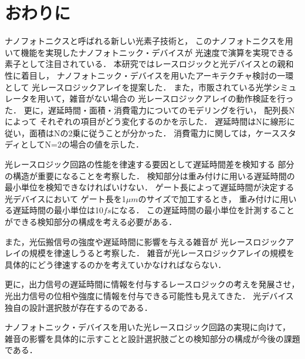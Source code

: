 \chapter{おわりに}

ナノフォトニクスと呼ばれる新しい光素子技術と，
このナノフォトニクスを用いて機能を実現したナノフォトニック・デバイスが
光速度で演算を実現できる素子として注目されている．
本研究ではレースロジックと光デバイスとの親和性に着目し，
ナノフォトニック・デバイスを用いたアーキテクチャ検討の一環として
光レースロジックアレイを提案した．
また，市販されている光学シミュレータを用いて，雑音がない場合の
光レースロジックアレイの動作検証を行った．
更に，遅延時間・面積・消費電力についてのモデリングを行い，
配列長Nによって
それぞれの項目がどう変化するのかを示した．
遅延時間はNに線形に従い，面積はNの2乗に従うことが分かった．
消費電力に関しては，ケーススタディとしてN=2の場合の値を示した．

光レースロジック回路の性能を律速する要因として遅延時間差を検知する
部分の構造が重要になることを考察した．
検知部分は重み付けに用いる遅延時間の最小単位を検知できなければいけない．
ゲート長によって遅延時間が決定する光デバイスにおいて
ゲート長を1$\mu m$のサイズで加工するとき，
重み付けに用いる遅延時間の最小単位は10$fs$になる．
この遅延時間の最小単位を計測することができる検知部分の構成を考える必要がある．

また，光伝搬信号の強度や遅延時間に影響を与える雑音が
光レースロジックアレイの規模を律速しうると考察した．
雑音が光レースロジックアレイの規模を具体的にどう律速するのかを考えていかなければならない．

更に，出力信号の遅延時間に情報を付与するレースロジックの考えを発展させ，
光出力信号の位相や強度に情報を付与できる可能性も見えてきた．
光デバイス独自の設計選択肢が存在するのである．

ナノフォトニック・デバイスを用いた光レースロジック回路の実現に向けて，
雑音の影響を具体的に示すことと設計選択肢ごとの検知部分の構成が今後の課題である．

